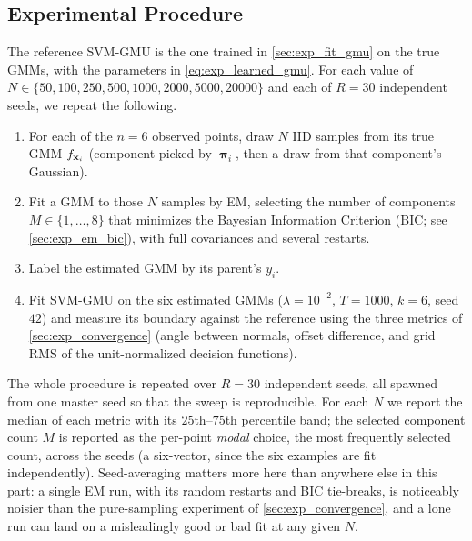 \documentclass[11pt, letterpaper]{article}
\newcommand{\bpi}{\boldsymbol{\uppi}}
\begin{document}
\subsection{Experimental Procedure}

The reference SVM-GMU is the one trained in \cref{sec:exp_fit_gmu} on the true GMMs, with the parameters in \cref{eq:exp_learned_gmu}. For each value of $N \in \{50, 100, 250, 500, 1000, 2000, 5000, 20000\}$ and each of $R = 30$ independent seeds, we repeat the following.
\begin{enumerate}[leftmargin=2em]
    \item For each of the $n = 6$ observed points, draw $N$ IID samples from its true GMM $f_{\vb{x}_i}$ (component picked by $\bpi_i$, then a draw from that component's Gaussian).
    \item Fit a GMM to those $N$ samples by EM, selecting the number of components $M \in \{1, \ldots, 8\}$ that minimizes the Bayesian Information Criterion (BIC; see \cref{sec:exp_em_bic}), with full covariances and several restarts.
    \item Label the estimated GMM by its parent's $y_i$.
    \item Fit SVM-GMU on the six estimated GMMs ($\lambda = 10^{-2}$, $T = 1000$, $k = 6$, seed $42$) and measure its boundary against the reference using the three metrics of \cref{sec:exp_convergence} (angle between normals, offset difference, and grid RMS of the unit-normalized decision functions).
\end{enumerate}
The whole procedure is repeated over $R = 30$ independent seeds, all spawned from one master seed so that the sweep is reproducible. For each $N$ we report the median of each metric with its $25$th--$75$th percentile band; the selected component count $M$ is reported as the per-point \emph{modal} choice, the most frequently selected count, across the seeds (a six-vector, since the six examples are fit independently). Seed-averaging matters more here than anywhere else in this part: a single EM run, with its random restarts and BIC tie-breaks, is noticeably noisier than the pure-sampling experiment of \cref{sec:exp_convergence}, and a lone run can land on a misleadingly good or bad fit at any given $N$.
\end{document}

